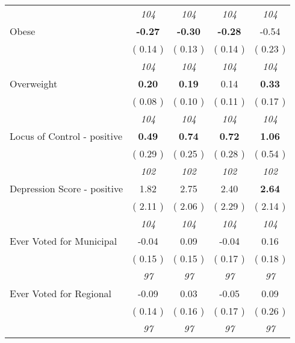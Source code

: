 \begin{tabular}{l c c c c}
& \textit{ 104 } & \textit{ 104 } & \textit{ 104 } & \textit{ 104 } \\
Obese & \textbf{     -0.27 } & \textbf{     -0.30 } & \textbf{     -0.28 } &     -0.54 \\
& (     0.14 ) & (     0.13 ) & (     0.14 ) & (     0.23 ) \\
& \textit{ 104 } & \textit{ 104 } & \textit{ 104 } & \textit{ 104 } \\
Overweight & \textbf{      0.20 } & \textbf{      0.19 } &      0.14 & \textbf{     0.33} \\
& (     0.08 ) & (     0.10 ) & (     0.11 ) & (     0.17 ) \\
& \textit{ 104 } & \textit{ 104 } & \textit{ 104 } & \textit{ 104 } \\
Locus of Control - positive & \textbf{      0.49 } & \textbf{      0.74 } & \textbf{      0.72 } & \textbf{     1.06} \\
& (     0.29 ) & (     0.25 ) & (     0.28 ) & (     0.54 ) \\
& \textit{ 102 } & \textit{ 102 } & \textit{ 102 } & \textit{ 102 } \\
Depression Score - positive &      1.82 &      2.75 &      2.40 & \textbf{     2.64} \\
& (     2.11 ) & (     2.06 ) & (     2.29 ) & (     2.14 ) \\
& \textit{ 104 } & \textit{ 104 } & \textit{ 104 } & \textit{ 104 } \\
Ever Voted for Municipal &     -0.04 &      0.09 &     -0.04 &      0.16 \\
& (     0.15 ) & (     0.15 ) & (     0.17 ) & (     0.18 ) \\
& \textit{ 97 } & \textit{ 97 } & \textit{ 97 } & \textit{ 97 } \\
Ever Voted for Regional &     -0.09 &      0.03 &     -0.05 &      0.09 \\
& (     0.14 ) & (     0.16 ) & (     0.17 ) & (     0.26 ) \\
& \textit{ 97 } & \textit{ 97 } & \textit{ 97 } & \textit{ 97 } \\
\bottomrule
\end{tabular}
